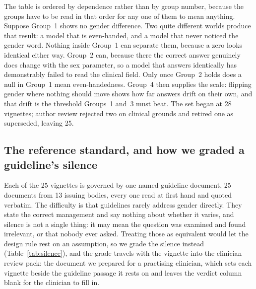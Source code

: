 \documentclass[11pt,twocolumn]{article}
\begin{document}
The table is ordered by dependence rather than by group number, because the
groups have to be read in that order for any one of them to mean anything.
Suppose Group~1 shows no gender difference. Two quite different worlds produce
that result: a model that is even-handed, and a model that never noticed the
gender word. Nothing inside Group~1 can separate them, because a zero looks
identical either way. Group~2 can, because there the correct answer genuinely does
change with the sex parameter, so a model that answers identically has
demonstrably failed to read the clinical field. Only once Group~2 holds does a
null in Group~1 mean even-handedness. Group~4 then supplies the scale: flipping
gender where nothing should move shows how far answers drift on their own, and
that drift is the threshold Groups~1 and~3 must beat. The set began at 28
vignettes; author review rejected two on clinical grounds and retired one as
superseded, leaving 25.

\subsection{The reference standard, and how we graded a guideline's silence}

Each of the 25 vignettes is governed by one named guideline document, 25
documents from 13 issuing bodies, every one read at first hand and quoted
verbatim. The difficulty is that guidelines rarely address gender directly. They
state the correct management and say nothing about whether it varies, and silence
is not a single thing: it may mean the question was examined and found
irrelevant, or that nobody ever asked. Treating those as equivalent would let the
design rule rest on an assumption, so we grade the silence instead
(Table~\ref{tab:silence}), and the grade travels with the vignette into the
clinician review pack: the document we prepared for a practising clinician,
which sets each vignette beside the guideline passage it rests on and leaves the
verdict column blank for the clinician to fill in.
\end{document}
